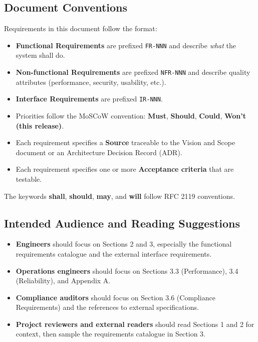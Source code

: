 \documentclass[11pt,a4paper]{article}
\begin{document}
\subsection{Document Conventions}

Requirements in this document follow the format:

\begin{itemize}
    \item \textbf{Functional Requirements} are prefixed \texttt{FR-NNN} and describe \textit{what} the system shall do.
    \item \textbf{Non-functional Requirements} are prefixed \texttt{NFR-NNN} and describe quality attributes (performance, security, usability, etc.).
    \item \textbf{Interface Requirements} are prefixed \texttt{IR-NNN}.
    \item Priorities follow the MoSCoW convention: \textbf{Must}, \textbf{Should}, \textbf{Could}, \textbf{Won't (this release)}.
    \item Each requirement specifies a \textbf{Source} traceable to the Vision and Scope document or an Architecture Decision Record (ADR).
    \item Each requirement specifies one or more \textbf{Acceptance criteria} that are testable.
\end{itemize}

The keywords \textbf{shall}, \textbf{should}, \textbf{may}, and \textbf{will} follow RFC 2119 conventions.

\subsection{Intended Audience and Reading Suggestions}

\begin{itemize}
    \item \textbf{Engineers} should focus on Sections 2 and 3, especially the functional requirements catalogue and the external interface requirements.
    \item \textbf{Operations engineers} should focus on Sections 3.3 (Performance), 3.4 (Reliability), and Appendix A.
    \item \textbf{Compliance auditors} should focus on Section 3.6 (Compliance Requirements) and the references to external specifications.
    \item \textbf{Project reviewers and external readers} should read Sections 1 and 2 for context, then sample the requirements catalogue in Section 3.
\end{itemize}
\end{document}
